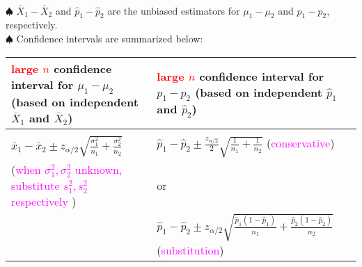 \documentclass[20pt,landscape]{foils}
\newcommand{\no}{\noindent}
\begin{document}
{{{{{{\foilhead[-.8in]{\textcolor{blue}{Two Populations}}
\no {\textcolor{magenta}{CI for mean difference $\mu_1-\mu_2$, or, the difference of two proportions, $p_1-p_2$}}  \\[.1in]
\no $\spadesuit$ $\bar{X}_1-\bar{X}_2$ and $\hat{p}_1-\hat{p}_2$ are the unbiased estimators for $\mu_1-\mu_2$ and $p_1-p_2$, respectively.\\[.1in]
\no $\spadesuit$ Confidence intervals are summarized below:\\[.15in]
\begin{tabular}{p{4in}|p{5in}}
    \textcolor{red}{large $n$} confidence interval for $\mu_{1}- \mu_{2}$ (based on
    independent $\bar{X}_{1}$ and  $\bar{X}_{2}$) &     \textcolor{red}{large $n$} confidence
    interval for $p_{1}- p_{2}$ (based on
    independent $\hat{p}_{1}$ and  $\hat{p}_{2}$) \\\hline
    & \\
    $\bar{x}_{1} - \bar{x}_{2} \pm z_{\alpha/2} \sqrt{\frac{\sigma_{1}^{2}}{n_{1}} +
    \frac{\sigma_{2}^{2}}{n_{2}}}$ 
   & $\hat{p}_{1}-\hat{p}_{2} \pm  \frac{z_{\alpha/2}}{2}
    \sqrt{\frac{1}{n_{1}}+\frac{1}{n_{2}}}$ (\textcolor{magenta}{conservative}) \\ 
    ({\textcolor{magenta}{when $\sigma_{1}^{2},\sigma_{2}^{2}$ unknown, substitute $s_{1}^{2}, s_{2}^{2}$ respectively }})    & or \\
    &  $\hat{p}_{1}-\hat{p}_{2} \pm z_{\alpha/2}
    \sqrt{\frac{\hat{p}_{1}(1-\hat{p}_{1})}{n_{1}} + \frac{\hat{p}_{2}{(1-\hat{p}_{2})}}{n_{2}}}$ (\textcolor{magenta}{substitution})
\end{tabular}

%
%
%

}}}}}}
\end{document}

